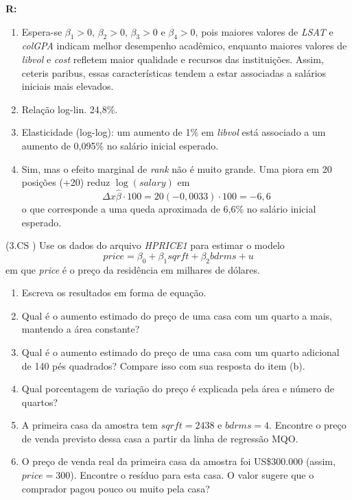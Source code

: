 \documentclass[12pt,letterpaper, onecolumn]{exam}
\renewenvironment{solution}
  {\par\noindent\textbf{R:}\enspace\color{blue}}
  {\par\color{black}}
\begin{document}
\begin{questions}
\begin{solution}
\begin{enumerate}[label=(\alph*)]
    Se \(\beta_5 = 0\), então o ranking da escola não tem efeito \textit{ceteris paribus} sobre o salário inicial esperado. Isso significa que, controlando pelas demais variáveis do modelo, a posição da escola no ranking não está associada a diferenças salariais.
    \item Espera-se \(\beta_1>0\), \(\beta_2>0\), \(\beta_3>0\) e \(\beta_4>0\), pois maiores valores de \textit{LSAT} e \textit{colGPA} indicam melhor desempenho acadêmico, enquanto maiores valores de \textit{libvol} e \textit{cost} refletem maior qualidade e recursos das instituições. Assim, ceteris paribus, essas características tendem a estar associadas a salários iniciais mais elevados.
    \item Relação log-lin. 24,8\%.
    \item Elasticidade (log-log): um aumento de 1\% em \textit{libvol} está associado a um aumento de 0,095\% no salário inicial esperado.
    \item Sim, mas o efeito marginal de \textit{rank} não é muito grande. Uma piora em 20 posições (+20) reduz \(\log(salary)\) em
    \[
     \Delta x \hat\beta\cdot100 =20(-0{,}0033)\cdot 100=-6,6
    \]
    o que corresponde a uma queda aproximada de 6,6\% no salário inicial esperado.
\end{enumerate}
\end{solution}

\question (3.CS \citep{wooldridge2016}) Use os dados do arquivo \textit{HPRICE1} para estimar o modelo
\[
price=\beta_0+\beta_1sqrft+\beta_2bdrms+u
\]
em que \textit{price} é o preço da residência em milhares de dólares.
\begin{enumerate}[label=(\alph*)]
    \item Escreva os resultados em forma de equação.
    \item Qual é o aumento estimado do preço de uma casa com um quarto a mais, mantendo a área constante?
    \item Qual é o aumento estimado do preço de uma casa com um quarto adicional de 140 pés quadrados? Compare isso com sua resposta do item (b).
    \item Qual porcentagem de variação do preço é explicada pela área e número de quartos?
    \item A primeira casa da amostra tem \(sqrft=2438\) e \(bdrms=4\). Encontre o preço de venda previsto dessa casa a partir da linha de regressão MQO.
    \item O preço de venda real da primeira casa da amostra foi US\$300.000 (assim, \(price=300\)). Encontre o resíduo para esta casa. O valor sugere que o comprador pagou pouco ou muito pela casa?
\end{enumerate}


\end{questions}


\end{document}

